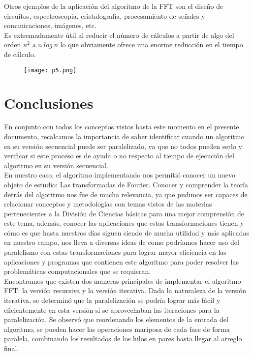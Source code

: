 \documentclass{article}
\begin{document}
Otros ejemplos de la aplicación del algoritmo de la FFT son el diseño de circuitos, espectroscopia, cristalografía, procesamiento de señales y comunicaciones, imágenes, etc.\\

Es extremadamente útil al reducir el número de cálculos a partir de algo del orden $n^{2}$ a $n~log~n$  lo que obviamente ofrece una enorme reducción en el tiempo de cálculo.\\

\begin{figure}[h]
\centering
\texttt{[image: p5.png]}
\end{figure} 

\newpage

\section{Conclusiones}

En conjunto con todos los conceptos vistos hasta este momento en el presente documento, recalcamos la importancia de saber identificar cuando un algoritmo en su versión secuencial puede ser paralelizado, ya que no todos pueden serlo y verificar si este proceso es de ayuda o no respecto al tiempo de ejecución del algoritmo en su versión secuencial.\\ 

En nuestro caso, el algoritmo implementando nos permitió conocer un nuevo objeto de estudio: Las transformadas de Fourier. Conocer y comprender la teoría detrás del algoritmo nos fue de mucha relevancia, ya que pudimos ser capaces de relacionar conceptos y metodologías con temas vistos de las materias pertenecientes a la División de Ciencias básicas para una mejor comprensión de este tema, además, conocer las aplicaciones que estas transformaciones tienen y cómo es que hasta nuestros días siguen siendo de mucha utilidad y más aplicadas en nuestro campo, nos lleva a diversas ideas de como podríamos hacer uso del paralelismo con estas transformaciones para lograr mayor eficiencia en las aplicaciones y programas que contienen este algoritmo para poder resolver las problemáticas computacionales que se requieran. \\

Encontramos que existen dos maneras principales de implementar el algoritmo FFT: la versión recursiva y la versión iterativa. Dada la naturaleza de la versión iterativa, se determinó que la paralelización se podría lograr más fácil y eficientemente en esta versión si se aprovechaban las iteraciones para la paralelización. Se observó que reordenando los elementos de la entrada del algoritmo, se pueden hacer las operaciones mariposa de cada fase de forma paralela, combinando los resultados de los hilos en pares hasta llegar al arreglo final. \\ 
\end{document}
